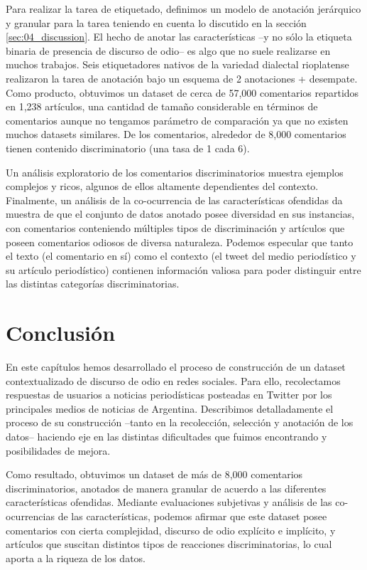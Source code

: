 Para realizar la tarea de etiquetado, definimos un modelo de anotación jerárquico y granular para la tarea teniendo en cuenta lo discutido en la sección \ref{sec:04_discussion}. El hecho de anotar las características --y no sólo la etiqueta binaria de presencia de discurso de odio-- es algo que no suele realizarse en muchos trabajos. Seis etiquetadores nativos de la variedad dialectal rioplatense realizaron la tarea de anotación bajo un esquema de 2 anotaciones + desempate. Como producto, obtuvimos un dataset de cerca de 57,000 comentarios repartidos en 1,238 artículos, una cantidad de tamaño considerable en términos de comentarios aunque no tengamos parámetro de comparación ya que no existen muchos datasets similares. De los comentarios, alrededor de 8,000 comentarios tienen contenido discriminatorio (una tasa de 1 cada 6).


Un análisis exploratorio de los comentarios discriminatorios muestra ejemplos complejos y ricos, algunos de ellos altamente dependientes del contexto. Finalmente, un análisis de la co-ocurrencia de las características ofendidas da muestra de que el conjunto de datos anotado posee diversidad en sus instancias, con comentarios conteniendo múltiples tipos de discriminación y artículos que poseen comentarios odiosos de diversa naturaleza. Podemos especular que tanto el texto (el comentario en sí) como el contexto (el tweet del medio periodístico y su artículo periodístico) contienen información valiosa para poder distinguir entre las distintas categorías discriminatorias.


\section{Conclusión}


En este capítulos hemos desarrollado el proceso de construcción de un dataset contextualizado de discurso de odio en redes sociales. Para ello, recolectamos respuestas de usuarios a noticias periodísticas posteadas en Twitter por los principales medios de noticias de Argentina. Describimos detalladamente el proceso de su construcción --tanto en la recolección, selección y anotación de los datos-- haciendo eje en las distintas dificultades que fuimos encontrando y posibilidades de mejora.

Como resultado, obtuvimos un dataset de más de 8,000 comentarios discriminatorios, anotados de manera granular de acuerdo a las diferentes características ofendidas. Mediante evaluaciones subjetivas y análisis de las co-ocurrencias de las características, podemos afirmar que este dataset posee comentarios con cierta complejidad, discurso de odio explícito e implícito, y artículos que suscitan distintos tipos de reacciones discriminatorias, lo cual aporta a la riqueza de los datos.

